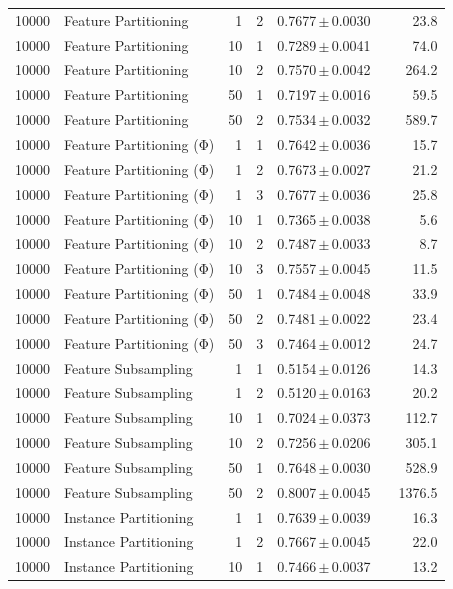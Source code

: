 \begin{table}[ht]
\begin{tabular}{rlrrccr}
10000 & Feature Partitioning & 1 & 2 & 0.7677\,$\pm$\,0.0030 &  & 23.8 \\
10000 & Feature Partitioning & 10 & 1 & 0.7289\,$\pm$\,0.0041 &  & 74.0 \\
10000 & Feature Partitioning & 10 & 2 & 0.7570\,$\pm$\,0.0042 &  & 264.2 \\
10000 & Feature Partitioning & 50 & 1 & 0.7197\,$\pm$\,0.0016 &  & 59.5 \\
10000 & Feature Partitioning & 50 & 2 & 0.7534\,$\pm$\,0.0032 &  & 589.7 \\
10000 & Feature Partitioning (Φ) & 1 & 1 & 0.7642\,$\pm$\,0.0036 &  & 15.7 \\
10000 & Feature Partitioning (Φ) & 1 & 2 & 0.7673\,$\pm$\,0.0027 &  & 21.2 \\
10000 & Feature Partitioning (Φ) & 1 & 3 & 0.7677\,$\pm$\,0.0036 &  & 25.8 \\
10000 & Feature Partitioning (Φ) & 10 & 1 & 0.7365\,$\pm$\,0.0038 &  & 5.6 \\
10000 & Feature Partitioning (Φ) & 10 & 2 & 0.7487\,$\pm$\,0.0033 &  & 8.7 \\
10000 & Feature Partitioning (Φ) & 10 & 3 & 0.7557\,$\pm$\,0.0045 &  & 11.5 \\
10000 & Feature Partitioning (Φ) & 50 & 1 & 0.7484\,$\pm$\,0.0048 &  & 33.9 \\
10000 & Feature Partitioning (Φ) & 50 & 2 & 0.7481\,$\pm$\,0.0022 &  & 23.4 \\
10000 & Feature Partitioning (Φ) & 50 & 3 & 0.7464\,$\pm$\,0.0012 &  & 24.7 \\
10000 & Feature Subsampling & 1 & 1 & 0.5154\,$\pm$\,0.0126 &  & 14.3 \\
10000 & Feature Subsampling & 1 & 2 & 0.5120\,$\pm$\,0.0163 &  & 20.2 \\
10000 & Feature Subsampling & 10 & 1 & 0.7024\,$\pm$\,0.0373 &  & 112.7 \\
10000 & Feature Subsampling & 10 & 2 & 0.7256\,$\pm$\,0.0206 &  & 305.1 \\
10000 & Feature Subsampling & 50 & 1 & 0.7648\,$\pm$\,0.0030 &  & 528.9 \\
10000 & Feature Subsampling & 50 & 2 & 0.8007\,$\pm$\,0.0045 &  & 1376.5 \\
10000 & Instance Partitioning & 1 & 1 & 0.7639\,$\pm$\,0.0039 &  & 16.3 \\
10000 & Instance Partitioning & 1 & 2 & 0.7667\,$\pm$\,0.0045 &  & 22.0 \\
10000 & Instance Partitioning & 10 & 1 & 0.7466\,$\pm$\,0.0037 &  & 13.2 \\

\end{tabular}
\end{table}
